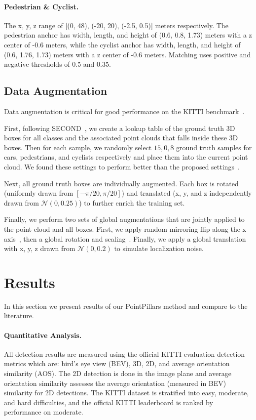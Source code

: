 \documentclass[10pt,twocolumn,letterpaper]{article}
\newcommand{\mypar}[1]{\vspace{-4mm}\paragraph{#1}}
\newcommand{\squeeze}{\vspace{-0.5mm}}
\begin{document}
\mypar{Pedestrian \& Cyclist.}
The x, y, z range of [(0, 48), (-20, 20), (-2.5, 0.5)] meters respectively.
The pedestrian anchor has width, length, and height of (0.6, 0.8, 1.73) meters with a z center of -0.6 meters, while the cyclist anchor has width, length, and height of (0.6, 1.76, 1.73) meters with a z center of -0.6 meters.
Matching uses positive and negative thresholds of 0.5 and 0.35.

\squeeze
\subsection{Data Augmentation}
\squeeze
Data augmentation is critical for good performance on the KITTI benchmark~\cite{second, pixor, mv3d}.

First, following SECOND~\cite{second}, we create a lookup table of the ground truth 3D boxes for all classes and the associated point clouds that falls inside these 3D boxes.
Then for each sample, we randomly select $15, 0, 8$ ground truth samples for cars, pedestrians, and cyclists respectively and place them into the current point cloud.
We found these settings to perform better than the proposed settings~\cite{second}.

Next, all ground truth boxes are individually augmented.
Each box is rotated (uniformly drawn from $[-\pi/20, \pi/20]$) and translated (x, y, and z independently drawn from $\mathcal{N}(0, 0.25)$) to further enrich the training set.

Finally, we perform two sets of global augmentations that are jointly applied to the point cloud and all boxes.
First, we apply random mirroring flip along the x axis~\cite{pixor}, then a global rotation and scaling~\cite{voxelnet, second}.
Finally, we apply a global translation with x, y, z drawn from $\mathcal{N}(0, 0.2)$ to simulate localization noise.

\section{Results} \label{sec:results}
\squeeze

In this section we present results of our PointPillars method and compare to the literature.

\squeeze
\mypar{Quantitative Analysis.}
All detection results are measured using the official KITTI evaluation detection metrics which are: bird's eye view (BEV), 3D, 2D, and average orientation similarity (AOS).
The 2D detection is done in the image plane and average orientation similarity assesses the average orientation (measured in BEV) similarity for 2D detections.
The KITTI dataset is stratified into easy, moderate, and hard difficulties, and the official KITTI leaderboard is ranked by performance on moderate.
\end{document}
